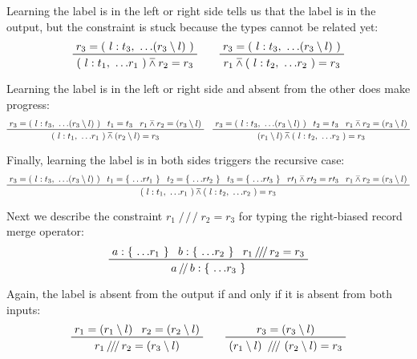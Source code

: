 \documentclass[11pt, twoside, reqno]{book}
\providecommand{\wedgeonwedge}{\barwedge}
\begin{document}
Learning the label is in the left or right side tells us that the label is in the output, but the constraint is stuck because the types cannot be related yet:
\begin{displaymath}
\prftree
  {r_3 = (\ l : t_3,\ \dots\!(r_3 \setminus l)\ )}
  {(\ l : t_1,\ \dots\!r_1\ ) \wedgeonwedge r_2 = r_3}
\qquad
\prftree
  {r_3 = (\ l : t_3,\ \dots\!(r_3 \setminus l)\ )}
  {r_1 \wedgeonwedge (\ l : t_2,\ \dots\!r_2\ ) = r_3}
\end{displaymath}

Learning the label is in the left or right side and absent from the other does make progress:
\begin{displaymath}
\prftree
  {r_3 = (\ l : t_3,\ \dots\!(r_3 \setminus l)\ )}
  {t_1 = t_3}
  {r_1 \wedgeonwedge r_2 = (r_3 \setminus l)}
  {(\ l : t_1,\ \dots\!r_1\ ) \wedgeonwedge (r_2 \setminus l) = r_3}
\quad
\prftree
  {r_3 = (\ l : t_3,\ \dots\!(r_3 \setminus l)\ )}
  {t_2 = t_3}
  {r_1 \wedgeonwedge r_2 = (r_3 \setminus l)}
  {(r_1 \setminus l) \wedgeonwedge (\ l : t_2,\ \dots\!r_2\ ) = r_3}
\end{displaymath}

Finally, learning the label is in both sides triggers the recursive case:
\begin{displaymath}
\prftree
  {r_3 = (\ l : t_3,\ \dots\!(r_3 \setminus l)\ )}
  {t_1 = \{\ \dots\!r\prime_1\ \}}
  {t_2 = \{\ \dots\!r\prime_2\ \}}  
  {t_3 = \{\ \dots\!r\prime_3\ \}}
  {r\prime_1 \wedgeonwedge r\prime_2 = r\prime_3}
  {r_1 \wedgeonwedge r_2 = (r_3 \setminus l)}
  {(\ l : t_1,\ \dots\!r_1\ ) \wedgeonwedge (\ l : t_2,\ \dots\!r_2\ ) = r_3}
\end{displaymath}



Next we describe the constraint \(r_1 \mathop{/\!/\!/} r_2 = r_3\) for typing the right-biased record merge operator:
\begin{displaymath}
\prftree{a : \{\ \dots\!r_1\ \}}{b : \{\ \dots\!r_2\ \}}{r_1 \mathop{/\!/\!/} r_2 = r_3}{a \mathop{/\!/} b : \{\ \dots\!r_3\ \}}
\end{displaymath}

Again, the label is absent from the output if and only if it is absent from both inputs:
\begin{displaymath}
\prftree{r_1 = (r_1 \setminus l)}{r_2 = (r_2 \setminus l)}{r_1 \mathop{/\!/\!/} r_2 = (r_3 \setminus l)}
\qquad
\prftree{r_3 = (r_3 \setminus l)}{(r_1 \setminus l)\ \mathop{/\!/\!/}\ (r_2 \setminus l) = r_3}
\end{displaymath}
\end{document}
